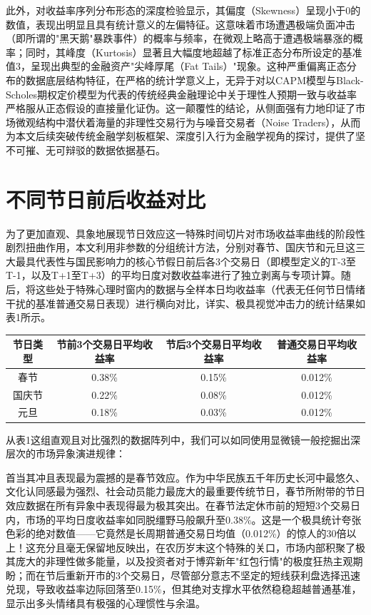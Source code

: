\documentclass{cupb-thesis}
\begin{document}
此外，对收益率序列分布形态的深度检验显示，其偏度（Skewness）呈现小于0的数值，表现出明显且具有统计意义的左偏特征。这意味着市场遭遇极端负面冲击（即所谓的"黑天鹅"暴跌事件）的概率与频率，在微观上略高于遭遇极端暴涨的概率；同时，其峰度（Kurtosis）显著且大幅度地超越了标准正态分布所设定的基准值3，呈现出典型的金融资产"尖峰厚尾（Fat Tails）"现象。这种严重偏离正态分布的数据底层结构特征，在严格的统计学意义上，无异于对以CAPM模型与Black-Scholes期权定价模型为代表的传统经典金融理论中关于理性人预期一致与收益率严格服从正态假设的直接量化证伪。这一颠覆性的结论，从侧面强有力地印证了市场微观结构中潜伏着海量的非理性交易行为与噪音交易者（Noise Traders），从而为本文后续突破传统金融学刻板框架、深度引入行为金融学视角的探讨，提供了坚不可摧、无可辩驳的数据依据基石。


\section{不同节日前后收益对比}


为了更加直观、具象地展现节日效应这一特殊时间切片对市场收益率曲线的阶段性剧烈扭曲作用，本文利用非参数的分组统计方法，分别对春节、国庆节和元旦这三大最具代表性与国民影响力的核心节假日前后各3个交易日（即模型定义的T-3至T-1，以及T+1至T+3）的平均日度对数收益率进行了独立剥离与专项计算。随后，将这些处于特殊心理时窗内的数据与全样本日均收益率（代表无任何节日情绪干扰的基准普通交易日表现）进行横向对比，详实、极具视觉冲击力的统计结果如表1所示。



\begin{table}[htbp]
  \centering
  \begin{tabular}{cccc}
    \toprule
    节日类型 & 节前3个交易日平均收益率 & 节后3个交易日平均收益率 & 普通交易日平均收益率 \\
    \midrule
    春节 & 0.38\% & 0.15\% & 0.012\% \\
    国庆节 & 0.22\% & 0.08\% & 0.012\% \\
    元旦 & 0.18\% & 0.03\% & 0.012\% \\
    \bottomrule
  \end{tabular}
\end{table}

从表1这组直观且对比强烈的数据阵列中，我们可以如同使用显微镜一般挖掘出深层次的市场异象演进规律：


首当其冲且表现最为震撼的是春节效应。作为中华民族五千年历史长河中最悠久、文化认同感最为强烈、社会动员能力最庞大的最重要传统节日，春节所附带的节日效应数据在所有异象中表现得最为极其突出。在春节法定休市前的短短3个交易日内，市场的平均日度收益率如同脱缰野马般飙升至0.38\%。这是一个极具统计夸张色彩的绝对数值——它竟然是长周期普通交易日均值（0.012\%）的惊人的30倍以上！这充分且毫无保留地反映出，在农历岁末这个特殊的关口，市场内部积聚了极其庞大的非理性做多能量，以及投资者对于博弈新年"红包行情"的极度狂热主观期盼；而在节后重新开市的3个交易日，尽管部分意志不坚定的短线获利盘选择迅速兑现，导致收益率边际回落至0.15\%，但其绝对支撑水平依然稳稳超越普通基准，显示出多头情绪具有极强的心理惯性与余温。
\end{document}
